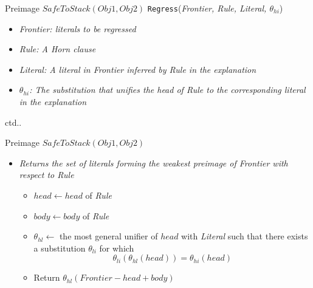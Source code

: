 \documentclass[%
pdf,
colorBG,
slideColor,
tcrico,
]{prosper}
\begin{document}
\begin{slide}{Preimage $SafeToStack(Obj1, Obj2)$  }
\tiny
	\texttt{Regress}({\em Frontier, Rule, Literal, $\theta_{hi}$})
	
	\begin{itemize}
	\item[] {\em Frontier:  literals to be regressed}
	\item[] {\em Rule: A Horn clause}
	\item[] {\em Literal: A literal in Frontier inferred by
	Rule in the explanation}
	\item[] $\theta_{hi}${\em : The substitution that unifies the head of Rule to the
	corresponding literal in the explanation}
	\end{itemize}
ctd..
\end{slide}


\begin{slide}{Preimage $SafeToStack(Obj1, Obj2)$  }
\tiny
	
	\begin{itemize}
	\item[] {\em Returns the set of literals forming the weakest preimage of
	Frontier with respect to Rule}
	
	\begin{itemize}
	\item $head \gets head$ of {\em Rule}
	\item $body \gets body$ of {\em Rule}
	\item $\theta_{hl} \gets$ the most general unifier of $head$ with {\em Literal} such
	that there exists a substitution $\theta_{li}$ for which
	\[ \theta_{li}(\theta_{hl}(head)) = \theta_{hi}(head) \]
	\item Return $\theta_{hl} ( Frontier - head + body)$
	\end{itemize}
	\end{itemize}
\end{slide}
\end{document}
